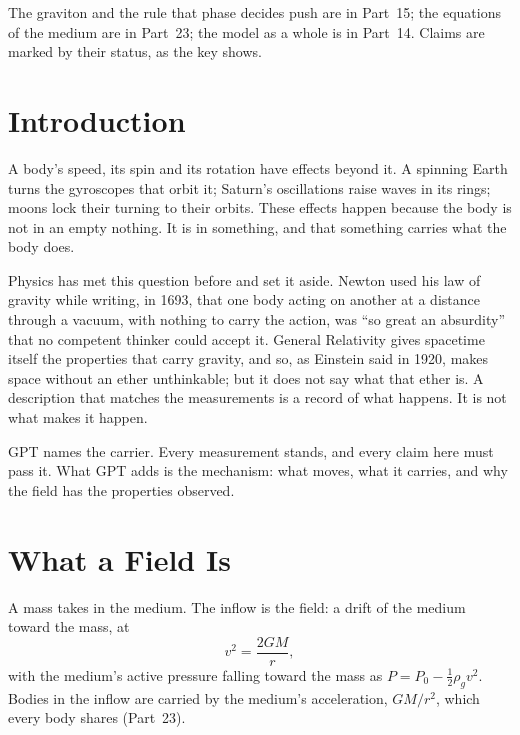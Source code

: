 \documentclass[11pt,a4paper]{article}
\begin{document}
The graviton and the rule that phase decides push are in Part~15; the equations of the medium are in Part~23; the model as a whole is in Part~14. Claims are marked by their status, as the key shows.

\statuskey

\section*{Introduction}

A body's speed, its spin and its rotation have effects beyond it. A spinning Earth turns the gyroscopes that orbit it; Saturn's oscillations raise waves in its rings; moons lock their turning to their orbits. These effects happen because the body is not in an empty nothing. It is in something, and that something carries what the body does.

Physics has met this question before and set it aside. Newton used his law of gravity while writing, in 1693, that one body acting on another at a distance through a vacuum, with nothing to carry the action, was ``so great an absurdity'' that no competent thinker could accept it. General Relativity gives spacetime itself the properties that carry gravity, and so, as Einstein said in 1920, makes space without an ether unthinkable; but it does not say what that ether is. A description that matches the measurements is a record of what happens. It is not what makes it happen.

GPT names the carrier.  Every measurement stands, and every claim here must pass it. What GPT adds is the mechanism: what moves, what it carries, and why the field has the properties observed.

\section{What a Field Is}
\label{sec:what}

\begin{hypbar}
A mass takes in the medium. The inflow is the field: a drift of the medium toward the mass, at
\begin{equation}
v^2 = \frac{2GM}{r},
\label{eq:inflow}
\end{equation}
with the medium's active pressure falling toward the mass as $P = P_0 - \tfrac12\rho_g v^2$. Bodies in the inflow are carried by the medium's acceleration, $GM/r^2$, which every body shares (Part~23).
\end{hypbar}
\end{document}
